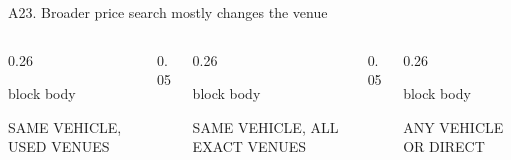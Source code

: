 \begin{frame}{A23. Broader price search mostly changes the venue}
\vspace{0.08cm}
\begin{columns}[T,totalwidth=0.94\textwidth]
\begin{column}{0.26\textwidth}
\begin{beamercolorbox}[rounded=true,sep=0.30cm,wd=\textwidth]{block body}
{\color{muted}\scriptsize SAME VEHICLE, USED VENUES\par}\vspace{0.10cm}
{\fontsize{25}{27}\selectfont\bfseries\color{ucldark}\ExactFrontierWithinShare\par}
\end{beamercolorbox}
\end{column}
\begin{column}{0.05\textwidth}\centering\vspace{0.56cm}{\large$\rightarrow$}\end{column}
\begin{column}{0.26\textwidth}
\begin{beamercolorbox}[rounded=true,sep=0.30cm,wd=\textwidth]{block body}
{\color{muted}\scriptsize SAME VEHICLE, ALL EXACT VENUES\par}\vspace{0.10cm}
{\fontsize{25}{27}\selectfont\bfseries\color{stable}\ExactFrontierSameVehicleShare\par}
\end{beamercolorbox}
\end{column}
\begin{column}{0.05\textwidth}\centering\vspace{0.56cm}{\large$\rightarrow$}\end{column}
\begin{column}{0.26\textwidth}
\begin{beamercolorbox}[rounded=true,sep=0.30cm,wd=\textwidth]{block body}
{\color{muted}\scriptsize ANY VEHICLE OR DIRECT\par}\vspace{0.10cm}
{\fontsize{25}{27}\selectfont\bfseries\color{stable}\ExactFrontierAllPathShare\par}

\end{beamercolorbox}
\end{column}
\end{columns}
\end{frame}
